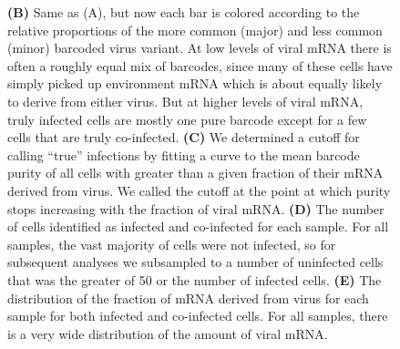 \documentclass[9pt,lineno]{elife}
\begin{document}
\begin{figure}
{{\bf (B)}
Same as (A), but now each bar is colored according to the relative proportions of the more common (major) and less common (minor) barcoded virus variant.
At low levels of viral mRNA there is often a roughly equal mix of barcodes, since many of these cells have simply picked up environment mRNA which is about equally likely to derive from either virus.
But at higher levels of viral mRNA, truly infected cells are mostly one pure barcode except for a few cells that are truly co-infected.
{\bf (C)}
We determined a cutoff for calling ``true'' infections by fitting a curve to the mean barcode purity of all cells with greater than a given fraction of their mRNA derived from virus.
We called the cutoff at the point at which purity stops increasing with the fraction of viral mRNA.
{\bf (D)}
The number of cells identified as infected and co-infected for each sample.
For all samples, the vast majority of cells were not infected, so for subsequent analyses we subsampled to a number of uninfected cells that was the greater of 50 or the number of infected cells.
{\bf (E)} 
The distribution of the fraction of mRNA derived from virus for each sample for both infected and co-infected cells.
For all samples, there is a very wide distribution of the amount of viral mRNA.
}
\label{fig:fracflu}
\end{figure}
\end{document}
